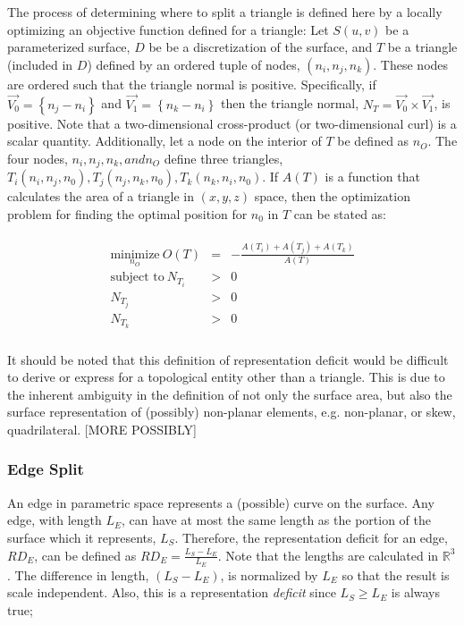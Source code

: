 The process of determining where to split a triangle is defined here by
a locally optimizing an objective function defined for a triangle: Let
$S(u,v)$ be a parameterized surface, $D$ be be a discretization of the
surface, and $T$ be a triangle (included in $D$) defined by an ordered
tuple of nodes, $\left(n_i, n_j, n_k\right)$. These nodes are ordered
such that the triangle normal is positive. Specifically, if $\vec{V_0} =
\left\{n_j - n_i \right\}$ and $\vec{V_1} = \left\{n_k - n_i\right\}$
then the triangle normal, $N_T = \vec{V_0} \times \vec{V_1}$, is
positive. Note that a two-dimensional cross-product (or two-dimensional
curl) is a scalar quantity. Additionally, let a node on the interior of
$T$ be defined as $n_O$. The four nodes, $n_i, n_j, n_k, and n_O$ define
three triangles, $T_i\left(n_i,n_j,n_0\right), T_j\left(n_j, n_k,
n_0\right), T_k\left(n_k, n_i, n_0\right)$. If $A(T)$ is a function that
calculates the area of a triangle in $\left(x,y,z\right)$ space, then
the optimization problem for finding the optimal position for $n_0$ in
$T$ can be stated as:

\begin{eqnarray*}
\begin{array}{rcl}
\underset{n_O}{\text{minimize}} \ O(T) & = & - \frac{A\left(T_i\right) + A\left(T_j\right) + A\left(T_k\right) }{ A\left(T\right) }\\
\text{subject to} \ N_{T_i} & > & 0 \\
N_{T_j} & > & 0 \\ 
N_{T_k} & > & 0 \\
\end{array}
\end{eqnarray*}

It should be noted that this definition of representation deficit would be difficult to derive or express for a topological entity other than a triangle. This is due to the inherent ambiguity in the definition of not only the surface area, but also the surface representation of (possibly) non-planar elements, e.g. non-planar, or skew, quadrilateral. [MORE POSSIBLY]

\subsubsection{Edge Split}
An edge in parametric space represents a (possible) curve on the
surface. Any edge, with length $L_E$, can have at most the same length
as the portion of the surface which it represents, $L_S$. Therefore, the
representation deficit for an edge, $RD_E$, can be defined as $RD_E =
\frac{L_S - L_E}{L_E}$. Note that the lengths are calculated in
${\mathbb R}^3$. The difference in length, $\left(L_S - L_E\right)$, is
normalized by $L_E$ so that the result is scale independent. Also, this
is a representation {\it deficit} since $L_S \ge L_E$ is always true;


